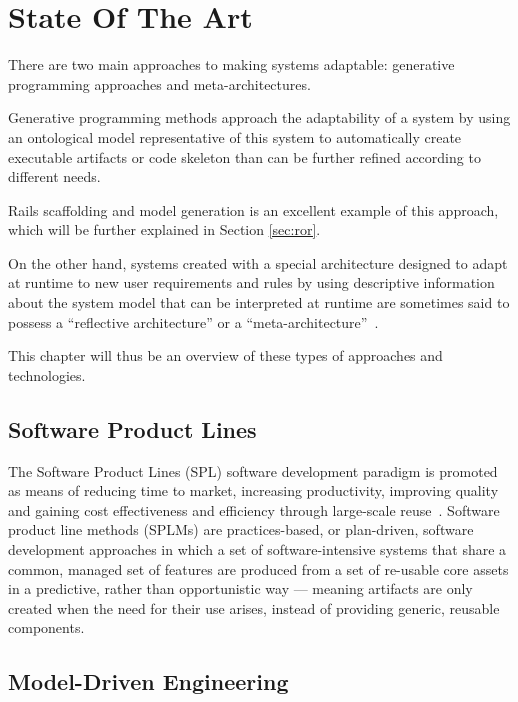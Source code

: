 \chapter{State Of The Art}\label{chap:sota}

There are two main approaches to making systems adaptable: generative programming approaches and meta-architectures.

Generative programming methods approach the adaptability of a system by using an ontological model representative of this system to automatically create executable artifacts or code skeleton than can be further refined according to different needs.

Rails scaffolding and model generation is an excellent example of this approach, which will be further explained in Section \ref{sec:ror}.

On the other hand, systems created with a special architecture designed to adapt at runtime to new user requirements and rules by using descriptive information about the system model that can be interpreted at runtime are sometimes said to possess a ``reflective architecture'' or a ``meta-architecture''~\cite{YBJ01}.

This chapter will thus be an overview of these types of approaches and technologies.

\section{Software Product Lines}\label{sec:spl}

The Software Product Lines (SPL) software development paradigm is promoted as means of reducing time to market, increasing productivity, improving quality and gaining cost effectiveness and efficiency through large-scale reuse~\cite{TC06}. Software product line methods (SPLMs) are practices-based, or plan-driven, software development approaches in which a set of software-intensive systems that share a common, managed set of features are produced from a set of re-usable core assets in a predictive, rather than opportunistic way --- meaning artifacts are only created when the need for their use arises, instead of providing generic, reusable components.


\section{Model-Driven Engineering}\label{sec:mda}

